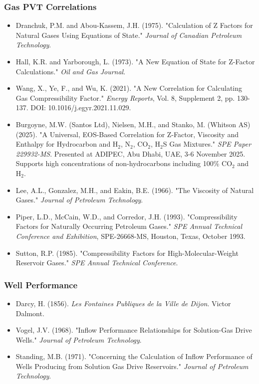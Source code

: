 \documentclass[11pt,a4paper]{article}
\begin{document}
\subsubsection{Gas PVT Correlations}
\begin{itemize}
\item Dranchuk, P.M. and Abou-Kassem, J.H. (1975). "Calculation of Z Factors for Natural Gases Using Equations of State." \textit{Journal of Canadian Petroleum Technology}.
\item Hall, K.R. and Yarborough, L. (1973). "A New Equation of State for Z-Factor Calculations." \textit{Oil and Gas Journal}.
\item Wang, X., Ye, F., and Wu, K. (2021). "A New Correlation for Calculating Gas Compressibility Factor." \textit{Energy Reports}, Vol. 8, Supplement 2, pp. 130-137. DOI: 10.1016/j.egyr.2021.11.029.
\item Burgoyne, M.W. (Santos Ltd), Nielsen, M.H., and Stanko, M. (Whitson AS) (2025). "A Universal, EOS-Based Correlation for Z-Factor, Viscosity and Enthalpy for Hydrocarbon and H$_2$, N$_2$, CO$_2$, H$_2$S Gas Mixtures." \textit{SPE Paper 229932-MS}. Presented at ADIPEC, Abu Dhabi, UAE, 3-6 November 2025. Supports high concentrations of non-hydrocarbons including 100\% CO$_2$ and H$_2$.
\item Lee, A.L., Gonzalez, M.H., and Eakin, B.E. (1966). "The Viscosity of Natural Gases." \textit{Journal of Petroleum Technology}.
\item Piper, L.D., McCain, W.D., and Corredor, J.H. (1993). "Compressibility Factors for Naturally Occurring Petroleum Gases." \textit{SPE Annual Technical Conference and Exhibition}, SPE-26668-MS, Houston, Texas, October 1993.
\item Sutton, R.P. (1985). "Compressibility Factors for High-Molecular-Weight Reservoir Gases." \textit{SPE Annual Technical Conference}.
\end{itemize}

\subsubsection{Well Performance}
\begin{itemize}
\item Darcy, H. (1856). \textit{Les Fontaines Publiques de la Ville de Dijon}. Victor Dalmont.
\item Vogel, J.V. (1968). "Inflow Performance Relationships for Solution-Gas Drive Wells." \textit{Journal of Petroleum Technology}.
\item Standing, M.B. (1971). "Concerning the Calculation of Inflow Performance of Wells Producing from Solution Gas Drive Reservoirs." \textit{Journal of Petroleum Technology}.
\end{itemize}
\end{document}

